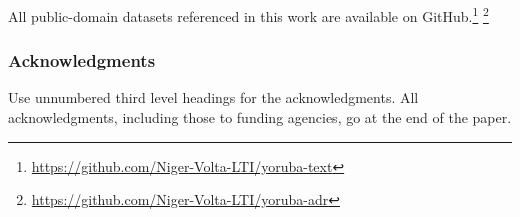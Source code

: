\documentclass{article} %
\begin{document}
All public-domain datasets referenced in this work are available on GitHub.\footnote{\url{https://github.com/Niger-Volta-LTI/yoruba-text}} \footnote{\url{https://github.com/Niger-Volta-LTI/yoruba-adr}}

\subsubsection*{Acknowledgments}
Use unnumbered third level headings for the acknowledgments. All
acknowledgments, including those to funding agencies, go at the end of the paper.




\end{document}
